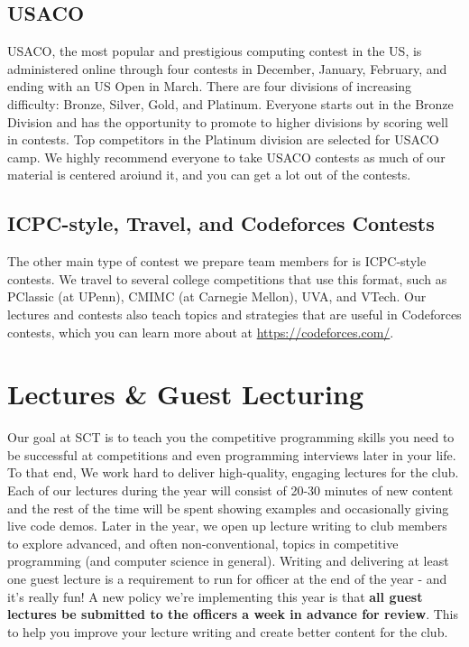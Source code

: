 \documentclass[11pt]{article}
\begin{document}
\subsection{USACO}
    USACO, the most popular and prestigious computing contest in the US, is administered online through four contests in December, January, February, and ending with an US Open in March. There are four divisions of increasing difficulty: Bronze, Silver, Gold, and Platinum. Everyone starts out in the Bronze Division and has the opportunity to promote to higher divisions by scoring well in contests. Top competitors in the Platinum division are selected for USACO camp. We highly recommend everyone to take USACO contests as much of our material is centered aroiund it, and you can get a lot out of the contests.
\subsection{ICPC-style, Travel, and Codeforces Contests}
    The other main type of contest we prepare team members for is ICPC-style contests. We travel to several college competitions that use this format, such as PClassic (at UPenn), CMIMC (at Carnegie Mellon), UVA, and VTech. Our lectures and contests also teach topics and strategies that are useful in Codeforces contests, which you can learn more about at \url{https://codeforces.com/}.
    
\section{Lectures \& Guest Lecturing}
    Our goal at SCT is to teach you the competitive programming skills you need to be successful at competitions and even programming interviews later in your life. To that end, We work hard to deliver high-quality, engaging lectures for the club. Each of our lectures during the year will consist of 20-30 minutes of new content and the rest of the time will be spent showing examples and occasionally giving live code demos.\newline\newline
    Later in the year, we open up lecture writing to club members to explore advanced, and often non-conventional, topics in competitive programming (and computer science in general). Writing and delivering at least one guest lecture is a requirement to run for officer at the end of the year - and it's really fun! A new policy we're implementing this year is that \textbf{all guest lectures be submitted to the officers a week in advance for review}. This to help you improve your lecture writing and create better content for the club.
    
\end{document}
